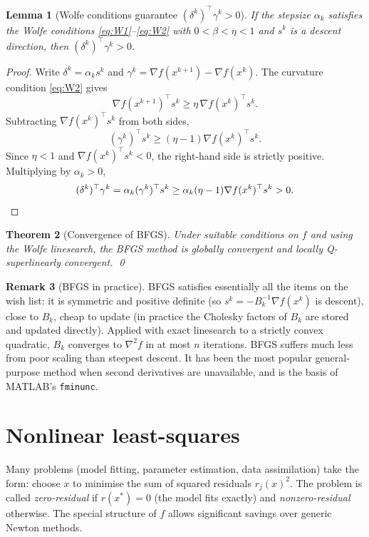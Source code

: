 \documentclass[11pt,a4paper]{report}
\theoremstyle{plain}
\newtheorem{theorem}{Theorem}[chapter]
\newtheorem{lemma}[theorem]{Lemma}
\theoremstyle{definition}
\newtheorem{remark}[theorem]{Remark}
\newcommand{\grad}{\nabla}
\newcommand{\hess}{\nabla^{2}}
\newcommand{\trans}{^{\top}}
\begin{document}
\begin{lemma}[Wolfe conditions guarantee $(\delta^{k})\trans\gamma^{k}>0$]\label{lem:wolfe-curvature}
If the stepsize $\alpha_{k}$ satisfies the Wolfe conditions \eqref{eq:W1}--\eqref{eq:W2} with $0<\beta<\eta<1$ and $s^{k}$ is a descent direction, then $(\delta^{k})\trans\gamma^{k}>0$.
\end{lemma}
\begin{proof}
Write $\delta^{k}=\alpha_{k}s^{k}$ and $\gamma^{k}=\grad f(x^{k+1})-\grad f(x^{k})$. The curvature condition \eqref{eq:W2} gives
\[
\grad f(x^{k+1})\trans s^{k}\ge\eta\,\grad f(x^{k})\trans s^{k}.
\]
Subtracting $\grad f(x^{k})\trans s^{k}$ from both sides,
\[
(\gamma^{k})\trans s^{k}\ge(\eta-1)\grad f(x^{k})\trans s^{k}.
\]
Since $\eta<1$ and $\grad f(x^{k})\trans s^{k}<0$, the right-hand side is strictly positive. Multiplying by $\alpha_{k}>0$,
\[
(\delta^{k})\trans\gamma^{k}=\alpha_{k}(\gamma^{k})\trans s^{k}\ge\alpha_{k}(\eta-1)\grad f(x^{k})\trans s^{k}>0.\qedhere
\]
\end{proof}

\begin{theorem}[Convergence of BFGS]\label{thm:BFGS-conv}
Under suitable conditions on $f$ and using the Wolfe linesearch, the BFGS method
is globally convergent and locally Q-superlinearly convergent. \qed
\end{theorem}

\begin{remark}[BFGS in practice]
BFGS satisfies essentially all the items on the wish list: it is symmetric and
positive definite (so $s^{k}=-B_{k}^{-1}\grad f(x^{k})$ is descent), close to $B_{k}$,
cheap to update (in practice the Cholesky factors of $B_{k}$ are stored and updated
directly). Applied with exact linesearch to a strictly convex quadratic, $B_{k}$
converges to $\hess f$ in at most $n$ iterations. BFGS suffers much less from poor
scaling than steepest descent. It has been the most popular general-purpose method
when second derivatives are unavailable, and is the basis of MATLAB's
\texttt{fminunc}.
\end{remark}

\section{Nonlinear least-squares}

Many problems (model fitting, parameter estimation, data assimilation) take the
form: choose $x$ to minimise the sum of squared residuals $r_{j}(x)^{2}$. The
problem is called \emph{zero-residual} if $r(x^{*})=0$ (the model fits exactly)
and \emph{nonzero-residual} otherwise. The special structure of $f$ allows
significant savings over generic Newton methods.
\end{document}
